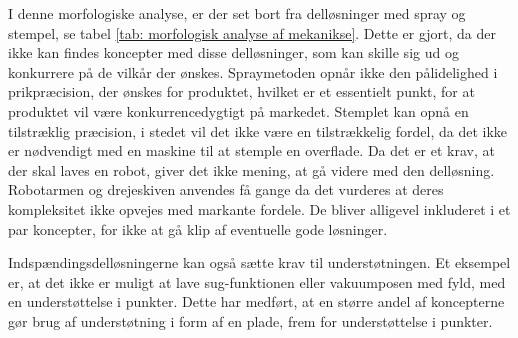 I denne morfologiske analyse, er der set bort fra delløsninger med spray og stempel, se tabel \ref{tab: morfologisk analyse af mekanikse}. Dette er gjort, da der ikke kan findes koncepter med disse delløsninger, som kan skille sig ud og konkurrere på de vilkår der ønskes. Spraymetoden opnår ikke den pålidelighed i prikpræcision, der ønskes for produktet, hvilket er et essentielt punkt, for at produktet vil være konkurrencedygtigt på markedet. Stemplet kan opnå en tilstræklig præcision, i stedet vil det ikke være en tilstrækkelig fordel, da det ikke er nødvendigt med en maskine til at stemple en overflade. Da det er et krav, at der skal laves en robot, giver det ikke mening, at gå videre med den delløsning. Robotarmen og drejeskiven anvendes få gange da det vurderes at deres kompleksitet ikke opvejes med markante fordele. De bliver alligevel inkluderet i et par koncepter, for ikke at gå klip af eventuelle gode løsninger.

Indspændingsdelløsningerne kan også sætte krav til understøtningen. Et eksempel er, at det ikke er muligt at lave sug-funktionen eller vakuumposen med fyld, med en understøttelse i punkter. Dette har medført, at en større andel af koncepterne gør brug af understøtning i form af en plade, frem for understøttelse i punkter. 




